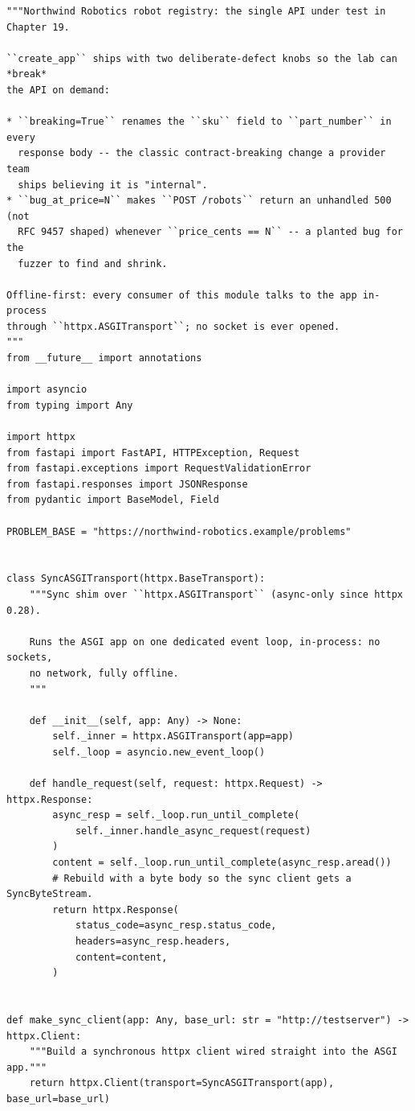\begin{verbatim}
"""Northwind Robotics robot registry: the single API under test in Chapter 19.

``create_app`` ships with two deliberate-defect knobs so the lab can *break*
the API on demand:

* ``breaking=True`` renames the ``sku`` field to ``part_number`` in every
  response body -- the classic contract-breaking change a provider team
  ships believing it is "internal".
* ``bug_at_price=N`` makes ``POST /robots`` return an unhandled 500 (not
  RFC 9457 shaped) whenever ``price_cents == N`` -- a planted bug for the
  fuzzer to find and shrink.

Offline-first: every consumer of this module talks to the app in-process
through ``httpx.ASGITransport``; no socket is ever opened.
"""
from __future__ import annotations

import asyncio
from typing import Any

import httpx
from fastapi import FastAPI, HTTPException, Request
from fastapi.exceptions import RequestValidationError
from fastapi.responses import JSONResponse
from pydantic import BaseModel, Field

PROBLEM_BASE = "https://northwind-robotics.example/problems"


class SyncASGITransport(httpx.BaseTransport):
    """Sync shim over ``httpx.ASGITransport`` (async-only since httpx 0.28).

    Runs the ASGI app on one dedicated event loop, in-process: no sockets,
    no network, fully offline.
    """

    def __init__(self, app: Any) -> None:
        self._inner = httpx.ASGITransport(app=app)
        self._loop = asyncio.new_event_loop()

    def handle_request(self, request: httpx.Request) -> httpx.Response:
        async_resp = self._loop.run_until_complete(
            self._inner.handle_async_request(request)
        )
        content = self._loop.run_until_complete(async_resp.aread())
        # Rebuild with a byte body so the sync client gets a SyncByteStream.
        return httpx.Response(
            status_code=async_resp.status_code,
            headers=async_resp.headers,
            content=content,
        )


def make_sync_client(app: Any, base_url: str = "http://testserver") -> httpx.Client:
    """Build a synchronous httpx client wired straight into the ASGI app."""
    return httpx.Client(transport=SyncASGITransport(app), base_url=base_url)



\end{verbatim}
